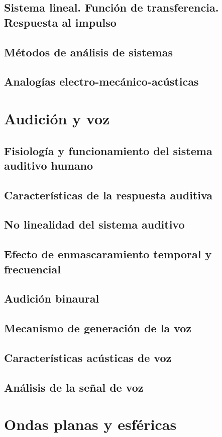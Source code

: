 \documentclass[a4paper]{book}
\begin{document}
\section{Sistema lineal. Función de transferencia. Respuesta al impulso}
\section{Métodos de análisis de sistemas}
\section{Analogías electro-mecánico-acústicas}

\chapter{Audición y voz}
\section{Fisiología y funcionamiento del sistema auditivo humano}
\section{Características de la respuesta auditiva}
\section{No linealidad del sistema auditivo}
\section{Efecto de enmascaramiento temporal y frecuencial}
\section{Audición binaural}
\section{Mecanismo de generación de la voz}
\section{Características acústicas de voz}
\section{Análisis de la señal de voz}

\chapter{Ondas planas y esféricas}
\end{document}
